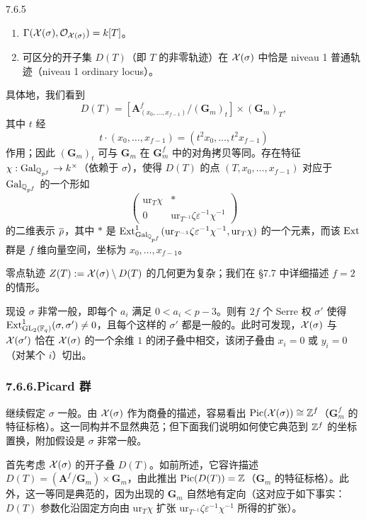 \begin{lem}{7.6.5}\label{thm:a4-7-6-5}
\begin{enumerate}[label=(\arabic*),leftmargin=2.4em,itemsep=0.15em]
\item $\Gamma(\mathcal{X}(\sigma),\mathcal{O}_{\mathcal{X}(\sigma)})=k[T]$。
\item 可区分的开子集 $D(T)$（即 $T$ 的非零轨迹）在 $\mathcal{X}(\sigma)$ 中恰是 niveau 1 普通轨迹（niveau 1 ordinary locus）。
\end{enumerate}
\end{lem}

具体地，我们看到
\[
D(T)=[\mathbf A^{f}_{(x_0,\dots,x_{f-1})}/(\mathbf G_m)_t]\times(\mathbf G_m)_T,
\]
其中 $t$ 经
\[
t\cdot(x_0,\dots,x_{f-1})=(t^2x_0,\dots,t^2x_{f-1})
\]
作用；因此 $(\mathbf G_m)_t$ 可与 $\mathbf G_m$ 在 $\mathbf G_m^{f}$ 中的对角拷贝等同。存在特征 $\chi:\operatorname{Gal}_{\mathbb{Q}_{p^f}}\to k^\times$（依赖于 $\sigma$），使得 $D(T)$ 的点 $(T,x_0,\dots,x_{f-1})$ 对应于 $\operatorname{Gal}_{\mathbb{Q}_{p^f}}$ 的一个形如
\[
\begin{pmatrix}\mathrm{ur}_T\chi&*\\0&\mathrm{ur}_{T^{-1}}\zeta\varepsilon^{-1}\chi^{-1}\end{pmatrix}
\]
的二维表示 $\overline{\rho}$，其中 $*$ 是 $\operatorname{Ext}^{1}_{\operatorname{Gal}_{\mathbb{Q}_{p^f}}}(\mathrm{ur}_{T^{-1}}\zeta\varepsilon^{-1}\chi^{-1},\mathrm{ur}_T\chi)$ 的一个元素，而该 $\operatorname{Ext}$ 群是 $f$ 维向量空间，坐标为 $x_0,\dots,x_{f-1}$。

零点轨迹 $Z(T):=\mathcal{X}(\sigma)\setminus D(T)$ 的几何更为复杂；我们在 §7.7 中详细描述 $f=2$ 的情形。

现设 $\sigma$ 非常一般，即每个 $a_i$ 满足 $0<a_i<p-3$。则有 $2f$ 个 Serre 权 $\sigma'$ 使得 $\operatorname{Ext}^{1}_{\mathrm{GL}_2(\mathbb{F}_q)}(\sigma,\sigma')\ne0$，且每个这样的 $\sigma'$ 都是一般的。此时可发现，$\mathcal{X}(\sigma)$ 与 $\mathcal{X}(\sigma')$ 恰在 $\mathcal{X}(\sigma)$ 的一个余维 $1$ 的闭子叠中相交，该闭子叠由 $x_i=0$ 或 $y_i=0$（对某个 $i$）切出。

\subsubsection*{7.6.6.\quad Picard 群}
继续假定 $\sigma$ 一般。由 $\mathcal{X}(\sigma)$ 作为商叠的描述，容易看出 $\mathrm{Pic}(\mathcal{X}(\sigma))\cong\mathbb{Z}^{f}$（$\mathbf G_m^{f}$ 的特征标格）。这一同构并不显然典范；但下面我们说明如何使它典范到 $\mathbb{Z}^{f}$ 的坐标置换，附加假设是 $\sigma$ 非常一般。

首先考虑 $\mathcal{X}(\sigma)$ 的开子叠 $D(T)$。如前所述，它容许描述 $D(T)=(\mathbf A^{f}/\mathbf G_m)\times\mathbf G_m$，由此推出 $\mathrm{Pic}(D(T))=\mathbb{Z}$（$\mathbf G_m$ 的特征标格）。此外，这一等同是典范的，因为出现的 $\mathbf G_m$ 自然地有定向（这对应于如下事实：$D(T)$ 参数化沿固定方向由 $\mathrm{ur}_T\chi$ 扩张 $\mathrm{ur}_{T^{-1}}\zeta\varepsilon^{-1}\chi^{-1}$ 所得的扩张）。


